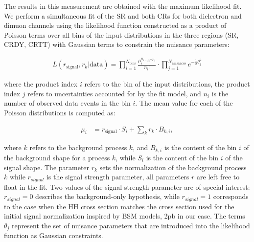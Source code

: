 
The results in this measurement are obtained with the maximum likelihood fit. We perform a simultaneous fit of the SR and both CRs for both dielectron and dimuon channels using the likelihood function constructed as a product
of Poisson terms over all bins of the input \mTHH distributions in the three regions (SR, CRDY, CRTT) with Gaussian terms to constrain the nuisance parameters:

\begin{align*}
 L(r_{\text{signal}}, r_{k}|\text{data}) = \prod_{i=1}^{N_{\mathrm{bins}}}\frac{\mu_{i}^{n_{i}}\cdot e^{-\mu_{i}}}{n_{i}!}
\cdot \prod_{j=1}^{N_{\mathrm{nuisances}}} e^{-\frac{1}{2}\theta_{j}^{2}}
\end{align*}

where the product index $i$ refers to the bin of the input distributions, the product index $j$
refers to uncertainties accounted for by the fit model, and $n_i$ is the number of observed data
events in the bin $i$. The mean value for each of the Poisson distributions is computed as:


\begin{align*}
\mu_{i} &= r_{\text{signal}} \cdot S_{i} + \sum_{k}r_{k}\cdot B_{k,i},
\end{align*}


where $k$ refers to the background process $k$, and $B_{k,i}$ is the content of the bin $i$ of the background
shape for a process $k$, while $S_i$ is the content of the bin $i$ of the signal shape. The parameter $r_k$
sets the normalization of the background process $k$ while $r_{signal}$ is the signal strength parameter, all parameters $r$ are left free to float in the fit.
Two values of the signal strength parameter are of special interest:  $r_{signal} = 0$ describes the
background-only hypothesis, while $r_{signal} = 1$ corresponds to the case when the HH cross section
matches the cross section used for the initial signal normalization inspired by BSM models, 2pb in our case. 
The terms $\theta_j$ represent the set of nuisance parameters that are introduced into the likelihood
function as Gaussian constraints. 


